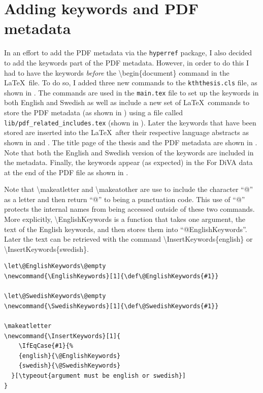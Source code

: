 \section{Adding keywords and PDF metadata}
\label{sec:addingKeywordsAndMetaDataToPDF}
In an effort to add the PDF metadata via the \texttt{hyperref} package, I also decided to add the keywords part of the PDF metadata. However, in order to do this I had to have the keywords \textit{before} the \textbackslash begin\{document\} command in the \LaTeX~file. To do so, I added three new commands to the \texttt{kththesis.cls} file, as shown in . The commands are used in the \texttt{main.tex} file to set up the keywords in both English and Swedish as well as include a new set of \LaTeX~commands to store the PDF metadata (as shown in ) using a file called \texttt{lib/pdf\_related\_includes.tex} (shown in ). Later the keywords that have been stored are inserted into the \LaTeX~after their respective language abstracts as shown in  and . The title page of the thesis and the PDF metadata are shown in . Note that both the English and Swedish version of the keywords are included in the metadata. Finally, the keywords appear (as expected) in the For DiVA data at the end of the PDF file as shown in .

Note that \textbackslash makeatletter and \textbackslash makeatother are use to include the character “@” as a letter and then return “@” to being a punctuation code. This use of “@” protects the internal names from being accessed outside of these two commands. More explicitly, \textbackslash EnglishKeywords is a function that takes one argument, the text of the English keywords, and then stores them into “@EnglishKeywords”. Later the text can be retrieved with the command \textbackslash InsertKeywords\{english\} or \textbackslash InsertKeywords\{swedish\}.
\begin{lstlisting}[language={[LaTeX]TeX}, caption={New commands in kththesis.cls}, label=lst:keywords]
% Keywords
\let\@EnglishKeywords\@empty
\newcommand{\EnglishKeywords}[1]{\def\@EnglishKeywords{#1}}

\let\@SwedishKeywords\@empty
\newcommand{\SwedishKeywords}[1]{\def\@SwedishKeywords{#1}}

\makeatletter
\newcommand{\InsertKeywords}[1]{
    \IfEqCase{#1}{%
    {english}{\@EnglishKeywords}
    {swedish}{\@SwedishKeywords}
  }[\typeout{argument must be english or swedish}]
}
\end{lstlisting}

